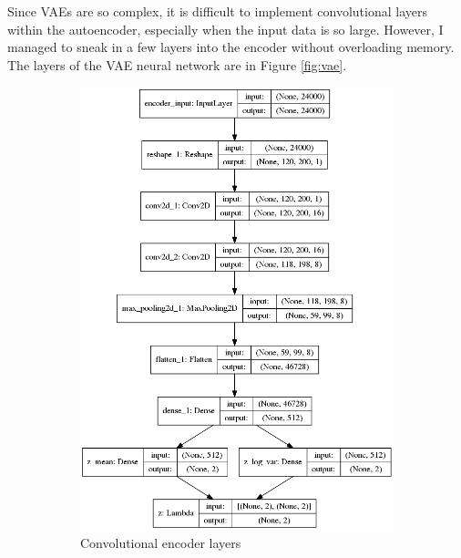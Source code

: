 \documentclass[a4paper]{article}
\begin{document}
Since VAEs are so complex, it is difficult to implement convolutional layers within the autoencoder, especially when the input data is so large. However, I managed to sneak in a few layers into the encoder without overloading memory. The layers of the VAE neural network are in Figure \ref{fig:vae}.

\begin{figure}[h!]
	\centering
	\begin{subfigure}{.49\textwidth}
		\centering
		\includegraphics[width=1\linewidth]{vae_mlp_encoder}
		\caption{Convolutional encoder layers}
		\label{fig:encoder}
	\end{subfigure}
	\begin{subfigure}{.49\textwidth}
		\centering
		\begin{subfigure}{.6\textwidth}
			\centering

\end{subfigure}
\end{subfigure}
\end{figure}
\end{document}
